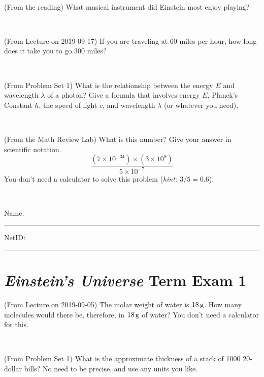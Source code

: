 \documentclass[12pt, letterpaper]{article}
\begin{document}
\vfill ~


\clearpage


\begin{problem} (From the reading)
What musical instrument did Einstein most enjoy playing?
\end{problem}


\vfill ~

\begin{problem} (From Lecture on 2019-09-17)
If you are traveling at 60 miles per hour, how long does
it take you to go 300 miles?
\end{problem}


\vfill ~

\begin{problem} (From Problem Set 1)
What is the relationship between the energy $E$ and wavelength
$\lambda$ of a photon? Give a formula that involves energy $E$,
Planck's Constant $h$, the speed of light $c$, and wavelength
$\lambda$ (or whatever you need).
\end{problem}

\vfill ~

\begin{problem} (From the Math Review Lab)
What is this number? Give your answer in scientific notation.
$$
\frac{(7\times10^{-34})\times(3\times10^8)}{5\times10^{-7}}
$$
You don't need a calculator to solve this problem (\textit{hint: $3/5=0.6$}).
\end{problem}


\vfill ~


\cleardoublepage



\noindent
Name: \rule[-1ex]{0.60\textwidth}{0.1pt}
NetID: \rule[-1ex]{0.20\textwidth}{0.1pt}

\section*{\textsl{Einstein's Universe} Term Exam 1}
\setcounter{problem}{1}


\begin{problem} (From Lecture on 2019-09-05)
The molar weight of water is $18\,\mathrm{g}$. How many molecules would there
be, therefore, in $18\,\mathrm{g}$ of water? You don't need a calculator for
this.
\end{problem}


\vfill ~

\begin{problem} (From Problem Set 1)
What is the approximate thickness of a stack of 1000 20-dollar bills?
No need to be precise, and use any units you like.
\end{problem}
\end{document}
